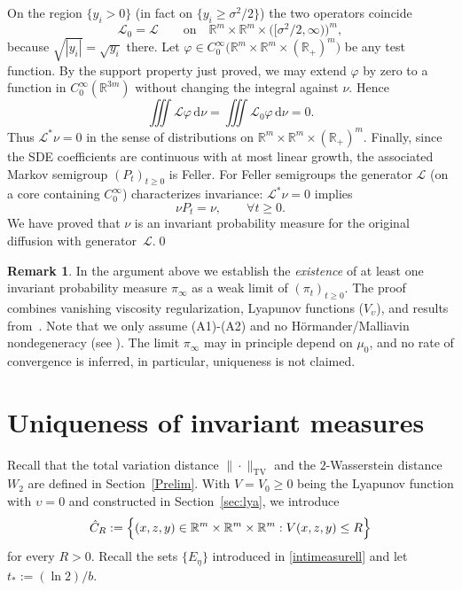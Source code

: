 \documentclass[11pt, a4paper,leqno]{amsart}
\theoremstyle{definition}
\newtheorem{remark}{Remark}[section]
\numberwithin{equation}{section}
\newcommand{\R}{\mathbb R}
\begin{document}
On the region $\{y_i>0\}$ (in fact on $\{y_i\geq\sigma^2/2\}$) the two operators coincide
\[
\mathcal L_0=\mathcal L
\qquad\text{on}\quad
\R^m\times\R^m\times\bigl([\sigma^2/2,\infty)\bigr)^m,
\]
because $\sqrt{|y_i|}=\sqrt{y_i}$ there. Let
$\varphi\in C_0^\infty\bigl(\R^m\times\R^m\times(\R_+)^m\bigr)$
be any test function. By the support property just proved, we may extend $\varphi$ by zero
to a function in $C_0^\infty(\R^{3m})$ without changing the integral against $\nu$.
Hence
\[
\iiint \mathcal L\varphi\,\mathrm d\nu
= \iiint \mathcal L_0\varphi\,\mathrm d\nu
= 0.
\]
Thus $\mathcal L^\ast\nu=0$ in the sense of distributions on
$\R^m\times\R^m\times(\R_+)^m$. Finally, since the SDE coefficients are continuous with at most linear growth,
the associated Markov semigroup $(P_t)_{t\ge0}$ is Feller.
For Feller semigroups the generator $\mathcal L$ (on a core containing $C_0^\infty$)
characterizes invariance: $\mathcal L^\ast\nu=0$ implies
\[
\nu P_t = \nu,\qquad \forall t\ge0.
\]
We have proved that $\nu$ is an invariant probability measure for the original
diffusion with generator~$\mathcal L$.\qed



\begin{remark}
In the argument above we establish the \emph{existence} of at least one invariant probability measure
$\pi_\infty$ as a weak limit of $(\pi_t)_{t\ge0}$. The proof combines vanishing viscosity
regularization, Lyapunov functions ($V_\upsilon$), and results from~\cite{BogachevKrylovRoeckner2015}.
Note that we only assume \textnormal{(A1)}-\textnormal{(A2)} and no Hörmander/Malliavin
nondegeneracy (see \cite{BouleauHirsch1991,Nualart2006}). The limit $\pi_\infty$ may in principle depend on $\mu_0$, and no rate of convergence
is inferred, in particular, uniqueness is not claimed.
\end{remark}


\section{Uniqueness of invariant measures}\label{aaaa}

Recall that the total variation distance $\|\cdot\|_{\mathrm{TV}}$
and the $2$-Wasserstein distance $W_2$ are defined in
Section~\ref{Prelim}.  With $V=V_0\geq 0$ being the Lyapunov function with $\upsilon=0$ and constructed  in Section~\ref{sec:lya}, we introduce
\begin{align}\label{pettabol}\hat C_R:=\Bigl\{(x,z,y)\in \mathbb R^m\times\mathbb R^m\times\mathbb R^m:
V(x,z,y)\le R\Bigr\}
\end{align}
for every $R>0$.  Recall the sets $\{E_\eta\}$ introduced in \eqref{intimeasurell} and let $t_\ast:=(\ln 2)/b$.
\end{document}
